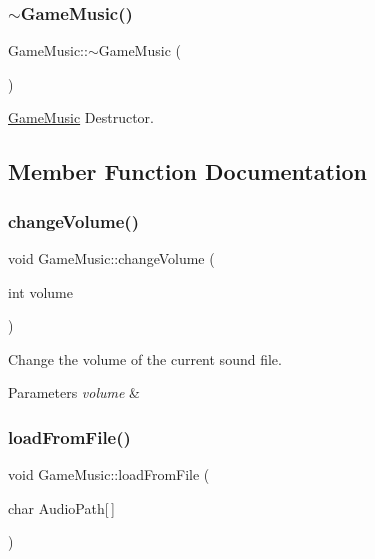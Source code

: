 \subsubsection{\texorpdfstring{$\sim$\+Game\+Music()}{~GameMusic()}}
{\footnotesize\ttfamily Game\+Music\+::$\sim$\+Game\+Music (\begin{DoxyParamCaption}{ }\end{DoxyParamCaption})\hspace{0.3cm}{\ttfamily [virtual]}}



\hyperlink{class_game_music}{Game\+Music} Destructor. 



\subsection{Member Function Documentation}
\mbox{\label{class_game_music_adafedd8d8c1b98efbac108c8f8b826ac}} 
\subsubsection{\texorpdfstring{change\+Volume()}{changeVolume()}}
{\footnotesize\ttfamily void Game\+Music\+::change\+Volume (\begin{DoxyParamCaption}\item[{int}]{volume }\end{DoxyParamCaption})}



Change the volume of the current sound file. 


\begin{DoxyParams}{Parameters}
{\em volume} & \\
\hline
\end{DoxyParams}
\mbox{\label{class_game_music_a47a770430dc1213a4b31ab0353549018}} 
\subsubsection{\texorpdfstring{load\+From\+File()}{loadFromFile()}}
{\footnotesize\ttfamily void Game\+Music\+::load\+From\+File (\begin{DoxyParamCaption}\item[{char}]{Audio\+Path\mbox{[}$\,$\mbox{]} }\end{DoxyParamCaption})}



